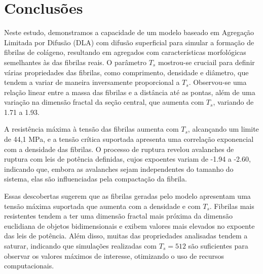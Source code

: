 \documentclass{article}
\begin{document}
\section{Conclusões}

    Neste estudo, demonstramos a capacidade de um modelo baseado em Agregação Limitada por Difusão (DLA) com difusão 
    superficial para simular a formação de fibrilas de colágeno, resultando em agregados com características morfológicas 
    semelhantes às das fibrilas reais. O parâmetro \(T_{s}\) mostrou-se cruciail para definir várias propriedades das 
    fibrilas, como comprimento, densidade e diâmetro, que tendem a variar de maneira inversamente proporcional a \(T_{s}\). 
    Observou-se uma relação linear entre a massa das fibrilas e a distância até as pontas, além de uma variação na dimensão 
    fractal da seção central, que aumenta com \(T_{s}\), variando de 1.71 a 1.93.

    A resistência máxima à tensão das fibrilas aumenta com \(T_{s}\), alcançando um limite de 44,1 MPa, e a tensão crítica 
    suportada apresenta uma correlação exponencial com a densidade das fibrilas. O processo de ruptura revelou avalanches 
    de ruptura com leis de potência definidas, cujos expoentes variam de -1.94 a -2.60, indicando que, embora as avalanches 
    sejam independentes do tamanho do sistema, elas são influenciadas pela compactação da fibrila.

    Essas descobertas sugerem que as fibrilas geradas pelo modelo apresentam uma tensão máxima suportada que aumenta com a 
    densidade e com \(T_{s}\). Fibrilas mais resistentes tendem a ter uma dimensão fractal mais próxima da dimensão 
    euclidiana de objetos bidimensionais e exibem valores mais elevados no expoente das leis de potência. Além disso, muitas 
    das propriedades analisadas tendem a saturar, indicando que simulações realizadas com \(T_{s} = 512\) são suficientes para 
    observar os valores máximos de interesse, otimizando o uso de recursos computacionais.








    
\end{document}
